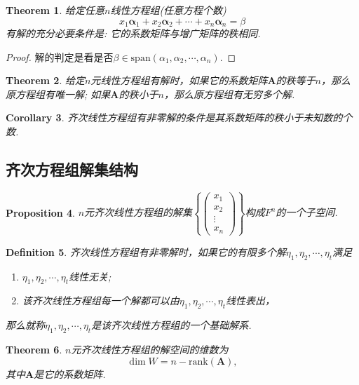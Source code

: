 \documentclass{article}
\newtheorem{theorem}{Theorem}[section]
\newtheorem{corollary}[theorem]{Corollary}
\newtheorem{proposition}[theorem]{Proposition}
\newtheorem{definition}[theorem]{Definition}
\newcommand{\vect}[1]{\mathbf{#1}} %
\newcommand{\mbf}[1]{\bm{#1}}
\begin{document}
\begin{theorem}
\rm 给定任意$n$线性方程组(任意方程个数)
$$
x_1 \vect{\alpha}_1 + x_2 \vect{\alpha}_2 + \cdots + x_n \vect{\alpha}_n = \beta
$$
有解的充分必要条件是: 它的系数矩阵与增广矩阵的秩相同.
\end{theorem}

\begin{proof}
解的判定是看是否$\beta \in \text{span}(\alpha_1,\alpha_2,\cdots,\alpha_n)$. 
\end{proof}

\begin{theorem}
\rm 给定$n$元线性方程组有解时，如果它的系数矩阵$\mbf{A}$的秩等于$n$，那么原方程组有唯一解; 如果$\mbf{A}$的秩小于$n$，那么原方程组有无穷多个解.
\end{theorem}

\begin{corollary}
\rm 齐次线性方程组有非零解的条件是其系数矩阵的秩小于未知数的个数.
\end{corollary}

\subsection{齐次方程组解集结构}

\begin{proposition}
\rm $n$元齐次线性方程组的解集$\left\{\begin{pmatrix}
x_1\\
x_2\\
\vdots \\
x_n
\end{pmatrix}\right\}$构成$F^n$的一个子空间.
\end{proposition}

\begin{definition}
\rm 齐次线性方程组有非零解时，如果它的有限多个解$\eta_1,\eta_2,\cdots,\eta_t$满足
\begin{enumerate}
	\item $\eta_1,\eta_2,\cdots,\eta_t$线性无关;
	\item 该齐次线性方程组每一个解都可以由$\eta_1,\eta_2,\cdots,\eta_t$线性表出，
\end{enumerate}
那么就称$\eta_1,\eta_2,\cdots,\eta_t$是该齐次线性方程组的一个基础解系.
\end{definition}

\begin{theorem}
\rm $n$元齐次线性方程组的解空间的维数为
$$
\dim W = n - \text{rank}(\mbf{A}),
$$
其中$\mbf{A}$是它的系数矩阵.
\end{theorem}
\end{document}
